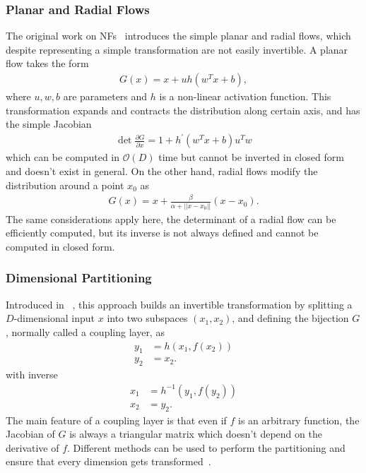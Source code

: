 \subsubsection{Planar and Radial Flows}
The original work on NFs~\cite{pmlr-v37-rezende15} introduces the simple planar and radial flows, which despite representing a simple transformation are not easily invertible.
A planar flow takes the form
%
\begin{align}
G(x) = x + u h(w^{T}x + b),
\end{align}
%
where $u, w, b$ are parameters and $h$ is a non-linear activation function. This transformation expands and contracts the distribution along certain axis, and has the simple Jacobian
%
\begin{align}
\det \frac{\partial G}{\partial x} = 1 + h^{'}(w^{T}x + b) u^{T}w
\end{align}
%
which can be computed in $\mathcal{O}(D)$ time but cannot be inverted in closed form and doesn't exist in general.
On the other hand, radial flows modify the distribution around a point $x_0$ as
%
\begin{align}
G(x) = x + \frac{\beta}{\alpha + ||x - x_0||}(x - x_0).
\end{align}
%
The same considerations apply here, the determinant of a radial flow can be efficiently computed, but its inverse is not always defined and cannot be computed in closed form.

\subsubsection{Dimensional Partitioning}

Introduced in ~\cite{coupling1, coupling2}, this approach builds an invertible transformation by splitting a $D$-dimensional input $x$ into two subspaces $(x_1, x_2)$, and defining the bijection $G$, normally called a coupling layer, as
%
\begin{align}
y_1 &= h(x_1, f(x_2))\\
y_2 &= x_2.
\end{align}
%
with inverse
%
\begin{align}
x_1 &= h^{-1}(y_1, f(y_2))\\
x_2 &= y_2.
\end{align}
%
The main feature of a coupling layer is that even if $f$ is an arbitrary function, the Jacobian of $G$ is always a triangular matrix which doesn't depend on the derivative of $f$. Different methods can be used to perform the partitioning and ensure that every dimension gets transformed~\cite{coupling2, glow}.

